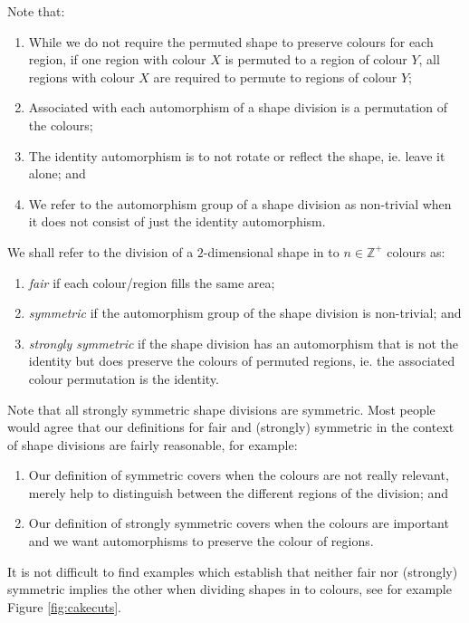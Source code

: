 Note that:
\begin{enumerate}
	\item While we do not require the permuted shape to preserve colours for each region, if one region with colour $X$ is permuted to a region of colour $Y$, all regions with colour $X$ are required to permute to regions of colour $Y$; 
	\item Associated with each automorphism of a shape division is a permutation of the colours;
	\item The identity automorphism is to not rotate or reflect the shape, ie. leave it alone; and
	\item We refer to the automorphism group of a shape division as non-trivial when it does not consist of just the identity automorphism.
\end{enumerate}

\begin{definition}
	We shall refer to the division of a $2$-dimensional shape in to $n \in \mathbb{Z}^+$ colours as:
	\begin{enumerate}
		\item \textit{fair} if each colour/region fills the same area;
		\item \textit{symmetric} if the automorphism group of the shape division is non-trivial; and
		\item \textit{strongly symmetric} if the shape division has an automorphism that is not the identity but does preserve the colours of permuted regions, ie. the associated colour permutation is the identity. 
	\end{enumerate}
\end{definition}

Note that all strongly symmetric shape divisions are symmetric. Most people would agree that our definitions for fair and (strongly) symmetric in the context of shape divisions are fairly reasonable, for example:
\begin{enumerate}
	\item Our definition of symmetric covers when the colours are not really relevant, merely help to distinguish between the different regions of the division; and
	\item Our definition of strongly symmetric covers when the colours are important and we want automorphisms to preserve the colour of regions.
\end{enumerate}

It is not difficult to find examples which establish that neither fair nor (strongly) symmetric implies the other when dividing shapes in to colours, see for example Figure \ref{fig:cakecuts}.

